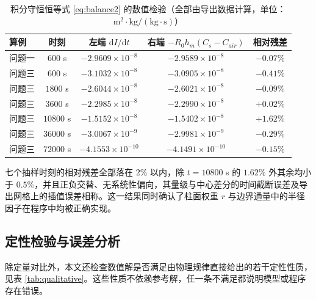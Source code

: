 \documentclass[12pt,a4paper]{article}
\begin{document}
\begin{table}[H]
\centering
\caption{积分守恒恒等式 \eqref{eq:balance2} 的数值检验（全部由导出数据计算，单位：$\mathrm{m^2\cdot kg/(kg\cdot s)}$）}
\label{tab:balance}
\begin{tabular}{lcccc}
\toprule
算例 & 时刻 & 左端 $\mathrm{d}I/\mathrm{d}t$ & 右端 $-R_0h_m(C_s-C_{air})$ & 相对残差\\
\midrule
问题一 & $600$ s & $-2.9609\times10^{-8}$ & $-2.9589\times10^{-8}$ & $-0.07\%$\\
问题三 & $600$ s & $-3.1032\times10^{-8}$ & $-3.0905\times10^{-8}$ & $-0.41\%$\\
问题三 & $1800$ s & $-2.6044\times10^{-8}$ & $-2.6021\times10^{-8}$ & $-0.09\%$\\
问题三 & $3600$ s & $-2.2985\times10^{-8}$ & $-2.2990\times10^{-8}$ & $+0.02\%$\\
问题三 & $10800$ s & $-1.5152\times10^{-8}$ & $-1.5402\times10^{-8}$ & $+1.62\%$\\
问题三 & $36000$ s & $-3.0067\times10^{-9}$ & $-2.9981\times10^{-9}$ & $-0.29\%$\\
问题三 & $72000$ s & $-4.1553\times10^{-10}$ & $-4.1491\times10^{-10}$ & $-0.15\%$\\
\bottomrule
\end{tabular}
\end{table}

七个抽样时刻的相对残差全部落在 $2\%$ 以内，除 $t=10800$ s 的 $1.62\%$ 外其余均小于 $0.5\%$，并且正负交替、无系统性偏向，其量级与中心差分的时间截断误差及导出网格上的插值误差相称。这一结果同时确认了柱面权重 $r$ 与边界通量中的半径因子在程序中均被正确实现。

\subsection{定性检验与误差分析}

除定量对比外，本文还检查数值解是否满足由物理规律直接给出的若干定性性质，见表 \ref{tab:qualitative}。这些性质不依赖参考解，任一条不满足都说明模型或程序存在错误。
\end{document}
